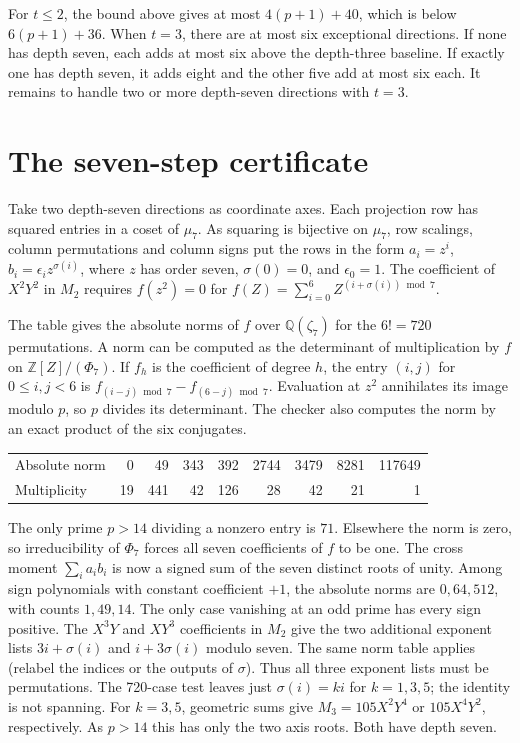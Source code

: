 \documentclass[11pt]{article}
\begin{document}
For $t\le2$, the bound above gives at most $4(p+1)+40$, which is
below $6(p+1)+36$. When $t=3$, there are at most six exceptional
directions. If none has depth seven, each adds at most six above
the depth-three baseline. If exactly one has depth seven, it adds
eight and the other five add at most six each. It remains to
handle two or more depth-seven directions with $t=3$.

\section{The seven-step certificate}
Take two depth-seven directions as coordinate axes. Each projection
row has squared entries in a coset of $\mu_7$. As squaring is
bijective on $\mu_7$, row scalings, column permutations and column
signs put the rows in the form $a_i=z^i$, $b_i=\epsilon_i z^{\sigma(i)}$,
where $z$ has order seven, $\sigma(0)=0$, and $\epsilon_0=1$.
The coefficient of $X^2Y^2$ in $M_2$ requires $f(z^2)=0$ for
$f(Z)=\sum_{i=0}^6 Z^{(i+\sigma(i))\bmod7}$.

\pagebreak[2]
The table gives the absolute norms of $f$ over $\mathbb Q(\zeta_7)$
for the $6!=720$ permutations. A norm can be computed as the
determinant of multiplication by $f$ on $\mathbb Z[Z]/(\Phi_7)$.
If $f_h$ is the coefficient of degree $h$, the entry $(i,j)$ for
$0\le i,j<6$ is $f_{(i-j)\bmod7}-f_{(6-j)\bmod7}$.
Evaluation at $z^2$ annihilates its image modulo $p$, so $p$
divides its determinant. The checker also computes the norm by
an exact product of the six conjugates.
\begin{center}
\small
\begin{tabular}{lrrrrrrrr}
\toprule
Absolute norm & 0 & 49 & 343 & 392 & 2744 & 3479 & 8281 & 117649\\
Multiplicity  &19 &441 &42 &126 &28 &42 &21 &1\\
\bottomrule
\end{tabular}
\end{center}

The only prime $p>14$ dividing a nonzero entry is $71$.
Elsewhere the norm is zero, so irreducibility of $\Phi_7$ forces
all seven coefficients of $f$ to be one. The cross moment
$\sum_i a_i b_i$ is now a signed sum of the seven distinct roots
of unity. Among sign polynomials with constant coefficient $+1$,
the absolute norms are $0,64,512$, with counts $1,49,14$. The only
case vanishing at an odd prime has every sign positive.
The $X^3Y$ and $XY^3$ coefficients in $M_2$ give the two additional
exponent lists $3i+\sigma(i)$ and $i+3\sigma(i)$ modulo seven.
The same norm table applies (relabel the indices or the outputs
of $\sigma$). Thus all three exponent lists must be permutations.
The 720-case test leaves just $\sigma(i)=ki$ for $k=1,3,5$; the
identity is not spanning. For $k=3,5$, geometric sums give
$M_3=105X^2Y^4$ or $105X^4Y^2$, respectively. As $p>14$ this
has only the two axis roots. Both have depth seven.
\end{document}
